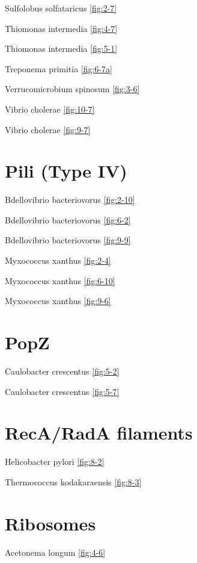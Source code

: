 \documentclass[]{tufte-book}
\begin{document}
Sulfolobus solfataricus \ref{fig:2-7}

Thiomonas intermedia \ref{fig:4-7}

Thiomonas intermedia \ref{fig:5-1}

Treponema primitia \ref{fig:6-7a}

Verrucomicrobium spinosum \ref{fig:3-6}

Vibrio cholerae \ref{fig:10-7}

Vibrio cholerae \ref{fig:9-7}

\hypertarget{pili-type-iv}{%
\section*{Pili (Type IV)}\label{pili-type-iv}}

Bdellovibrio bacteriovorus \ref{fig:2-10}

Bdellovibrio bacteriovorus \ref{fig:6-2}

Bdellovibrio bacteriovorus \ref{fig:9-9}

Myxococcus xanthus \ref{fig:2-4}

Myxococcus xanthus \ref{fig:6-10}

Myxococcus xanthus \ref{fig:9-6}

\hypertarget{popz}{%
\section*{PopZ}\label{popz}}

Caulobacter crescentus \ref{fig:5-2}

Caulobacter crescentus \ref{fig:5-7}

\hypertarget{recarada-filaments}{%
\section*{RecA/RadA filaments}\label{recarada-filaments}}

Helicobacter pylori \ref{fig:8-2}

Thermococcus kodakaraensis \ref{fig:8-3}

\hypertarget{ribosomes}{%
\section*{Ribosomes}\label{ribosomes}}

Acetonema longum \ref{fig:4-6}
\end{document}

